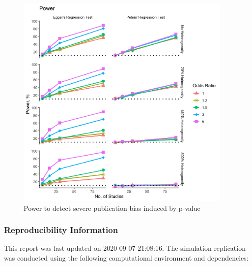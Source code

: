 \documentclass[
  english,
  doc,floatsintext,draftall]{apa6}
\begin{document}
\begin{figure}
\includegraphics[width=300pt]{../figures/power_es_moderate} \caption{Power to detect severe publication bias induced by p-value}\label{fig:unnamed-chunk-5}
\end{figure}

\hypertarget{reproducibility-information}{%
\subsubsection{Reproducibility Information}\label{reproducibility-information}}

This report was last updated on 2020-09-07 21:08:16.
The simulation replication was conducted using the following computational environment and dependencies:
\end{document}
